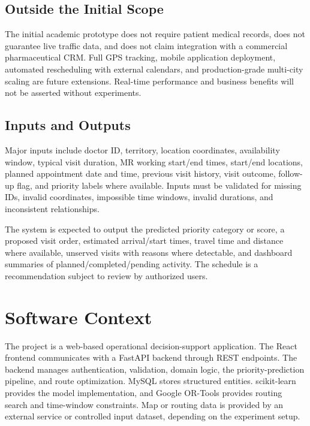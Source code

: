\documentclass[12pt,a4paper,oneside]{report}
\begin{document}
\subsection{Outside the Initial Scope}
The initial academic prototype does not require patient medical records, does not guarantee live traffic data, and does not claim integration with a commercial pharmaceutical CRM. Full GPS tracking, mobile application deployment, automated rescheduling with external calendars, and production-grade multi-city scaling are future extensions. Real-time performance and business benefits will not be asserted without experiments.

\subsection{Inputs and Outputs}
Major inputs include doctor ID, territory, location coordinates, availability window, typical visit duration, MR working start/end times, start/end locations, planned appointment date and time, previous visit history, visit outcome, follow-up flag, and priority labels where available. Inputs must be validated for missing IDs, invalid coordinates, impossible time windows, invalid durations, and inconsistent relationships.

The system is expected to output the predicted priority category or score, a proposed visit order, estimated arrival/start times, travel time and distance where available, unserved visits with reasons where detectable, and dashboard summaries of planned/completed/pending activity. The schedule is a recommendation subject to review by authorized users.

\section{Software Context}
The project is a web-based operational decision-support application. The React frontend communicates with a FastAPI backend through REST endpoints. The backend manages authentication, validation, domain logic, the priority-prediction pipeline, and route optimization. MySQL stores structured entities. scikit-learn provides the model implementation, and Google OR-Tools provides routing search and time-window constraints. Map or routing data is provided by an external service or controlled input dataset, depending on the experiment setup.
\end{document}
